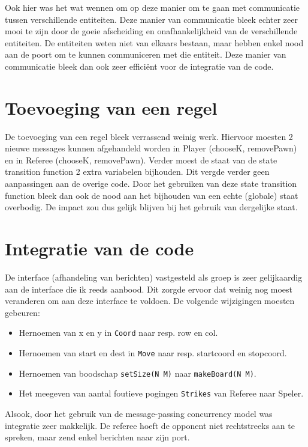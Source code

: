 \documentclass{article}
\begin{document}
Ook hier was het wat wennen om op deze manier om te gaan met communicatie tussen verschillende entiteiten. Deze manier van communicatie bleek echter zeer mooi te zijn door de goeie afscheiding en onafhankelijkheid van de verschillende entiteiten. De entiteiten weten niet van elkaars bestaan, maar hebben enkel nood aan de poort om te kunnen communiceren met die entiteit. Deze manier van communicatie bleek dan ook zeer efficiënt voor de integratie van de code.


\section{Toevoeging van een regel}
De toevoeging van een regel bleek verrassend weinig werk. Hiervoor moesten 2 nieuwe messages kunnen afgehandeld worden in Player (chooseK, removePawn) en in Referee (chooseK, removePawn). Verder moest de staat van de state transition function 2 extra variabelen bijhouden. Dit vergde verder geen aanpassingen aan de overige code.
Door het gebruiken van deze state transition function bleek dan ook de nood aan het bijhouden van een echte (globale) staat overbodig. De impact zou dus gelijk blijven bij het gebruik van dergelijke staat.


\section{Integratie van de code}

De interface (afhandeling van berichten) vastgesteld als groep is zeer gelijkaardig aan de interface die ik reeds aanbood. Dit zorgde ervoor dat weinig nog moest veranderen om aan deze interface te voldoen. De volgende wijzigingen moesten gebeuren:
\begin{itemize}
	\item Hernoemen van x en y in \texttt{Coord} naar resp. row en col.
	\item Hernoemen van start en dest in \texttt{Move} naar resp. startcoord en stopcoord. 
	\item Hernoemen van boodschap \texttt{setSize(N M)} naar \texttt{makeBoard(N M)}.
	\item Het meegeven van aantal foutieve pogingen \texttt{Strikes} van Referee naar Speler.
\end{itemize}
Alsook, door het gebruik van de message-passing concurrency model was integratie zeer makkelijk. De referee hoeft de opponent niet rechtstreeks aan te spreken, maar zend enkel berichten naar zijn port. 
	
\end{document}
